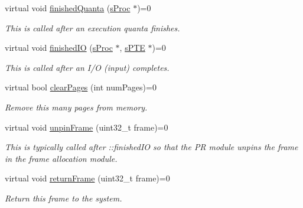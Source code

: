 \begin{DoxyCompactItemize}
\item 
virtual void \hyperlink{classcPRPolicy_adfe4408f052b6ec414331ba1bafc736b}{finished\-Quanta} (\hyperlink{structsProc}{s\-Proc} $\ast$)=0
\begin{DoxyCompactList}\small\item\em \-This is called after an execution quanta finishes. \end{DoxyCompactList}\item 
virtual void \hyperlink{classcPRPolicy_a169fb952830fa103a72a1cd223ac081f}{finished\-I\-O} (\hyperlink{structsProc}{s\-Proc} $\ast$, \hyperlink{structsPTE}{s\-P\-T\-E} $\ast$)=0
\begin{DoxyCompactList}\small\item\em \-This is called after an \-I/\-O (input) completes. \end{DoxyCompactList}\item 
virtual bool \hyperlink{classcPRPolicy_a7a2b6d5761963a69d20794579d39530f}{clear\-Pages} (int num\-Pages)=0
\begin{DoxyCompactList}\small\item\em \-Remove this many pages from memory. \end{DoxyCompactList}\item 
\hypertarget{classcPRPolicy_a8ef7dce4fcf989f6aa212920055fa4bb}{virtual void \hyperlink{classcPRPolicy_a8ef7dce4fcf989f6aa212920055fa4bb}{unpin\-Frame} (uint32\-\_\-t frame)=0}\label{d7/df0/classcPRPolicy_a8ef7dce4fcf989f6aa212920055fa4bb}

\begin{DoxyCompactList}\small\item\em \-This is typically called after \-::finished\-I\-O so that the \-P\-R module unpins the frame in the frame allocation module. \end{DoxyCompactList}\item 
virtual void \hyperlink{classcPRPolicy_ac78fc5c56b8f485eb18f6f36968612f1}{return\-Frame} (uint32\-\_\-t frame)=0
\begin{DoxyCompactList}\small\item\em \-Return this frame to the system. \end{DoxyCompactList}\end{DoxyCompactItemize}



